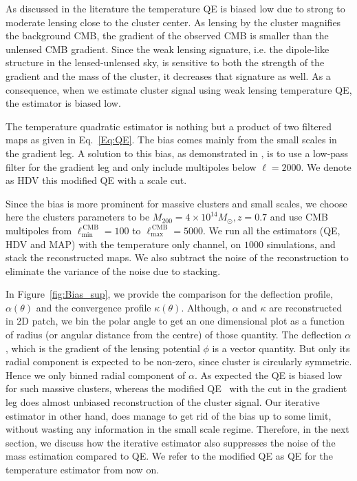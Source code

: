 \documentclass[prd, superscriptaddress, tightenlines, longbibliography, nofootinbib, eqsecnum, amsfonts, amsmath, floatfix, twocolumn, notitlepage]{revtex4-2}
\newcommand{\JC}[1]{\color{purple}{{JC:#1}}\color{black}\xspace}
\newcommand{\LL}[1]{{\color{orange}{LL: #1}}}
\begin{document}
As discussed in the literature \cite{Maturi:2004zj, Hu:2007bt} the temperature QE is biased low due to strong to moderate lensing close to the cluster center. 
As lensing by the cluster magnifies the background CMB, the gradient of the observed CMB is smaller than the unlensed CMB gradient.
Since the weak lensing signature, i.e. the dipole-like structure in the lensed-unlensed sky, is sensitive to both the strength of the gradient and the mass of the cluster, it decreases that signature as well. 
As a consequence, when we estimate cluster signal using weak lensing temperature QE, the estimator is biased low.

The temperature quadratic estimator is nothing but a product of two filtered maps as given in Eq.~\ref{Eq:QE}. The bias comes mainly from the small scales in the gradient leg. 
A solution to this bias, as demonstrated in \cite{Hu:2007bt}, is to use a low-pass filter for the gradient leg and only include multipoles below $\ell=2000$. We denote as HDV this modified QE with a scale cut.


Since the bias is more prominent for massive clusters and small scales, we choose here the clusters parameters to be $M_{200} = 4 \times 10^{14} M_{\odot}, z=0.7$ and use CMB multipoles from $\ell_{\text{min}}^{\, \text{CMB}}=100$ to $\ell_{\text{max}}^{\, \text{CMB}} = 5000$. 
We run all the estimators (QE, HDV and MAP) with the temperature only channel, on $1000$ simulations, and stack the reconstructed maps.
We also subtract the noise of the reconstruction to eliminate the variance of the noise due to stacking. \LL{how do you estimate the noise?}

In Figure~\ref{fig:Bias_sup}, we provide the comparison for the deflection profile, $\alpha(\theta)$  and the convergence profile $\kappa (\theta)$. 
Although, $\alpha$ and $\kappa$ are reconstructed in 2D patch, we bin the polar angle to get an one dimensional plot as a function of radius (or angular distance from the centre) of those quantity. 
The deflection $\alpha$, which is the gradient of the lensing potential $\phi$ is a vector quantity. 
But only its radial component is expected to be non-zero, since cluster is circularly symmetric. 
Hence we only binned radial component of $\alpha$. As expected the QE is biased low for such massive clusters, whereas the modified QE~\cite{Hu:2007bt} with the cut in the gradient leg does almost unbiased reconstruction of the cluster signal. 
Our iterative estimator in other hand, does manage to get rid of the bias up to some limit\JC{Must quantify this}, without wasting any information in the small scale regime\JC{how much was wasted with cut?}.
Therefore, in the next section, we discuss how the iterative estimator also suppresses the noise of the mass estimation compared to QE. We refer to the modified QE as QE \JC{hmm} for the temperature estimator from now on.
\end{document}
